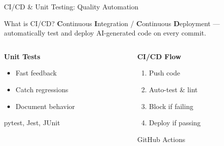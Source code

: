 \documentclass[aspectratio=169]{beamer}
\begin{document}
\begin{frame}{CI/CD \& Unit Testing: Quality Automation}
  \begin{block}{What is CI/CD?}
    \textbf{C}ontinuous \textbf{I}ntegration / \textbf{C}ontinuous \textbf{D}eployment --- automatically test and deploy AI-generated code on every commit.
  \end{block}

  \vspace{0.5cm}

  \begin{columns}[T]
    \begin{column}{0.48\textwidth}
      \centering
      \large\bfseries
      \textcolor{conesaTeal}{Unit Tests}

      \vspace{0.3cm}
      \normalsize

      \begin{itemize}
        \item Fast feedback
        \item Catch regressions
        \item Document behavior
      \end{itemize}

      \vspace{0.2cm}
      \small
      pytest, Jest, JUnit
    \end{column}
    \begin{column}{0.48\textwidth}
      \centering
      \large\bfseries
      \textcolor{conesaOrange}{CI/CD Flow}

      \vspace{0.3cm}
      \normalsize

      \begin{enumerate}
        \item Push code
        \item Auto-test \& lint
        \item Block if failing
        \item Deploy if passing
      \end{enumerate}

      \vspace{0.2cm}
      \small
      GitHub Actions
    \end{column}
  \end{columns}
\end{frame}
\end{document}
